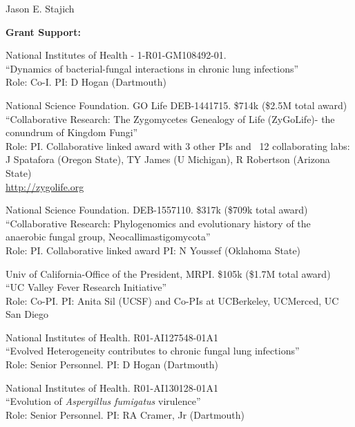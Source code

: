 \documentclass[10pt]{article}
\begin{document}
\begin{cv}{\centerline{Jason E. Stajich}}
\begin{cvlistcompact}{\bf Grant Support:}
\item [2014-2017] National Institutes of Health - 1-R01-GM108492-01. \\
``Dynamics of bacterial-fungal interactions in chronic lung infections'' \\
Role: Co-I. PI: D Hogan (Dartmouth)

\item [2015-2018] National Science Foundation. GO Life
  DEB-1441715. \$714k (\$2.5M total award) \\
``Collaborative Research: The Zygomycetes Genealogy of Life
  (ZyGoLife)- the conundrum of Kingdom Fungi'' \\
  Role: PI. Collaborative linked award with 3 other PIs and ~12
  collaborating labs: J Spatafora (Oregon State), TY James (U
  Michigan), R Robertson (Arizona State) \\
\url{http://zygolife.org} 

\item [2016-2019] National Science Foundation. DEB-1557110. \$317k
  (\$709k total award) \\
``Collaborative Research: Phylogenomics and evolutionary history of the anaerobic fungal group, Neocallimastigomycota'' \\
Role: PI. Collaborative linked award PI: N Youssef (Oklahoma State)

\item [2017-2020] Univ of California-Office of the President, MRPI. \$105k
  (\$1.7M total award) \\
``UC Valley Fever Research Initiative'' \\
Role: Co-PI.  PI: Anita Sil (UCSF) and Co-PIs at UCBerkeley, UCMerced,
UC San Diego

\item [2017-2020] National Institutes of Health. R01-AI127548-01A1 \\
``Evolved Heterogeneity contributes to chronic fungal lung
  infections'' \\
Role: Senior Personnel. PI: D Hogan (Dartmouth)

\item [2017-2020] National Institutes of Health. R01-AI130128-01A1 \\
  ``Evolution of \textit{Aspergillus fumigatus} virulence'' \\
Role: Senior Personnel. PI: RA Cramer, Jr (Dartmouth)

\item [{\bf Completed support}]


\end{cvlistcompact}
\end{cv}
\end{document}
